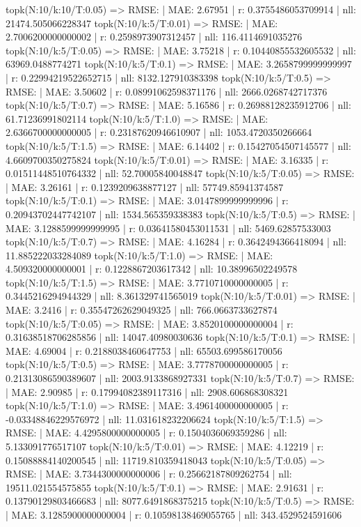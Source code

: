 topk(N:10/k:10/T:0.05) => RMSE: | MAE: 2.67951 | r: 0.3755486053709914 | nll: 21474.505066228347
topk(N:10/k:5/T:0.01) => RMSE: | MAE: 2.7006200000000002 | r: 0.2598973907312457 | nll: 116.4114691035276
topk(N:10/k:5/T:0.05) => RMSE: | MAE: 3.75218 | r: 0.10440855532605532 | nll: 63969.0488774271
topk(N:10/k:5/T:0.1) => RMSE: | MAE: 3.2658799999999997 | r: 0.22994219522652715 | nll: 8132.127910383398
topk(N:10/k:5/T:0.5) => RMSE: | MAE: 3.50602 | r: 0.08991062598371176 | nll: 2666.0268742717376
topk(N:10/k:5/T:0.7) => RMSE: | MAE: 5.16586 | r: 0.26988128235912706 | nll: 61.71236991802114
topk(N:10/k:5/T:1.0) => RMSE: | MAE: 2.6366700000000005 | r: 0.23187620946610907 | nll: 1053.4720350266664
topk(N:10/k:5/T:1.5) => RMSE: | MAE: 6.14402 | r: 0.15427054507145577 | nll: 4.6609700350275824
topk(N:10/k:5/T:0.01) => RMSE: | MAE: 3.16335 | r: 0.01511448510764332 | nll: 52.70005840048847
topk(N:10/k:5/T:0.05) => RMSE: | MAE: 3.26161 | r: 0.1239209638877127 | nll: 57749.85941374587
topk(N:10/k:5/T:0.1) => RMSE: | MAE: 3.0147899999999996 | r: 0.20943702447742107 | nll: 1534.565359338383
topk(N:10/k:5/T:0.5) => RMSE: | MAE: 3.1288599999999995 | r: 0.03641580453011531 | nll: 5469.62857533003
topk(N:10/k:5/T:0.7) => RMSE: | MAE: 4.16284 | r: 0.3642494366418094 | nll: 11.885222033284089
topk(N:10/k:5/T:1.0) => RMSE: | MAE: 4.509320000000001 | r: 0.1228867203617342 | nll: 10.38996502249578
topk(N:10/k:5/T:1.5) => RMSE: | MAE: 3.7710710000000005 | r: 0.3445216294944329 | nll: 8.361329741565019
topk(N:10/k:5/T:0.01) => RMSE: | MAE: 3.2416 | r: 0.35547262629049325 | nll: 766.0663733627874
topk(N:10/k:5/T:0.05) => RMSE: | MAE: 3.8520100000000004 | r: 0.31638518706285856 | nll: 14047.40980030636
topk(N:10/k:5/T:0.1) => RMSE: | MAE: 4.69004 | r: 0.2188038460647753 | nll: 65503.699586170056
topk(N:10/k:5/T:0.5) => RMSE: | MAE: 3.7778700000000005 | r: 0.21313086590389607 | nll: 2003.9133868927331
topk(N:10/k:5/T:0.7) => RMSE: | MAE: 2.90985 | r: 0.17994082389117316 | nll: 2908.606868308321
topk(N:10/k:5/T:1.0) => RMSE: | MAE: 3.4961400000000005 | r: -0.03348846229576972 | nll: 11.031618232206624
topk(N:10/k:5/T:1.5) => RMSE: | MAE: 4.4295800000000005 | r: 0.1504036069359286 | nll: 5.133091776517107
topk(N:10/k:5/T:0.01) => RMSE: | MAE: 4.12219 | r: 0.15088884140200545 | nll: 11719.810359418043
topk(N:10/k:5/T:0.05) => RMSE: | MAE: 3.7344300000000006 | r: 0.25662187809262754 | nll: 19511.021554575855
topk(N:10/k:5/T:0.1) => RMSE: | MAE: 2.91631 | r: 0.13790129803466683 | nll: 8077.6491868375215
topk(N:10/k:5/T:0.5) => RMSE: | MAE: 3.1285900000000004 | r: 0.10598138469055765 | nll: 343.4529524591606
